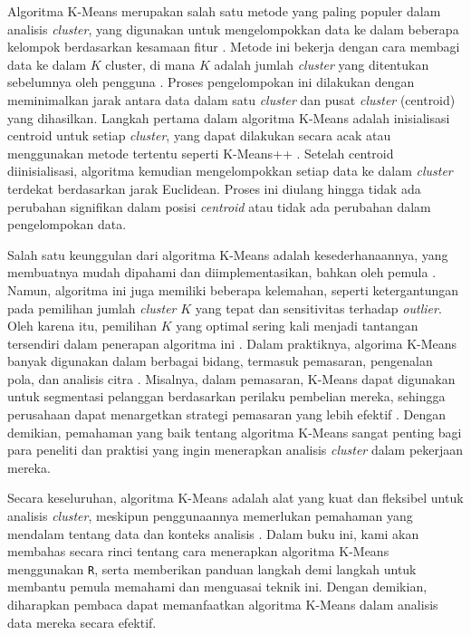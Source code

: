 \documentclass[
  oneside]{book}
\begin{document}
Algoritma K-Means merupakan salah satu metode yang paling populer dalam analisis \emph{cluster}, yang digunakan untuk mengelompokkan data ke dalam beberapa kelompok berdasarkan kesamaan fitur \citep{jain2010} . Metode ini bekerja dengan cara membagi data ke dalam \(K\) cluster, di mana \(K\) adalah jumlah \emph{cluster} yang ditentukan sebelumnya oleh pengguna \citep{macqueen1967some}. Proses pengelompokan ini dilakukan dengan meminimalkan jarak antara data dalam satu \emph{cluster} dan pusat \emph{cluster} (centroid) yang dihasilkan. Langkah pertama dalam algoritma K-Means adalah inisialisasi centroid untuk setiap \emph{cluster}, yang dapat dilakukan secara acak atau menggunakan metode tertentu seperti K-Means++ \citep{arthur2007kmeans}. Setelah centroid diinisialisasi, algoritma kemudian mengelompokkan setiap data ke dalam \emph{cluster} terdekat berdasarkan jarak Euclidean\citep{hastie2009elements}. Proses ini diulang hingga tidak ada perubahan signifikan dalam posisi \emph{centroid} atau tidak ada perubahan dalam pengelompokan data.

Salah satu keunggulan dari algoritma K-Means adalah kesederhanaannya, yang membuatnya mudah dipahami dan diimplementasikan, bahkan oleh pemula \citep{han2011data}. Namun, algoritma ini juga memiliki beberapa kelemahan, seperti ketergantungan pada pemilihan jumlah \emph{cluster} \(K\) yang tepat dan sensitivitas terhadap \emph{outlier}. Oleh karena itu, pemilihan \(K\) yang optimal sering kali menjadi tantangan tersendiri dalam penerapan algoritma ini \citep{elbow1975outline}. Dalam praktiknya, algorima K-Means banyak digunakan dalam berbagai bidang, termasuk pemasaran, pengenalan pola, dan analisis citra \citep{xu2005survey}. Misalnya, dalam pemasaran, K-Means dapat digunakan untuk segmentasi pelanggan berdasarkan perilaku pembelian mereka, sehingga perusahaan dapat menargetkan strategi pemasaran yang lebih efektif \citep{kumar2016creating}. Dengan demikian, pemahaman yang baik tentang algoritma K-Means sangat penting bagi para peneliti dan praktisi yang ingin menerapkan analisis \emph{cluster} dalam pekerjaan mereka.

Secara keseluruhan, algoritma K-Means adalah alat yang kuat dan fleksibel untuk analisis \emph{cluster}, meskipun penggunaannya memerlukan pemahaman yang mendalam tentang data dan konteks analisis \citep{bishop2006pattern}. Dalam buku ini, kami akan membahas secara rinci tentang cara menerapkan algoritma K-Means menggunakan \texttt{R}, serta memberikan panduan langkah demi langkah untuk membantu pemula memahami dan menguasai teknik ini. Dengan demikian, diharapkan pembaca dapat memanfaatkan algoritma K-Means dalam analisis data mereka secara efektif.
\end{document}
